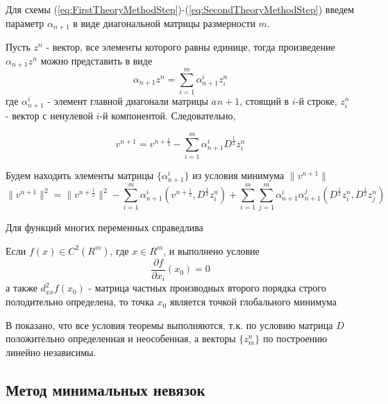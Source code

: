 Для схемы (\ref{eq:FirstTheoryMethodStep})-(\ref{eq:SecondTheoryMethodStep}) введем параметр $\alpha_{n+1}$ в виде диагональной матрицы размерности $m$.

Пусть $z^n$ - вектор, все элементы которого равны единице, тогда произведение $\alpha_{n+1}z^n$ можно представить в виде
\begin{equation}
    \label{eq:AlphaZSumm}
    \alpha_{n+1}z^n=\sum^m_{i=1}\alpha^i_{n+1}z^n_i
\end{equation}
где $\alpha^i_{n+1}$ - элемент главной диагонали матрицы $a_{}n+1$, стоящий в $i$-й строке, $z^n_i$ - вектор с ненулевой $i$-й компонентой. Следовательно,

\begin{equation}
    \label{eq:VAlphaDZSumm}
    v^{n+1}=v^{n+\frac{1}{2}}-\sum^m_{i=1}\alpha^i_{n+1}D^{\frac{1}{2}}z^n_i
\end{equation}

Будем находить элементы матрицы $\{\alpha^i_{n+1}\}$ из условия минимума $\|v^{n+1}\|$
\begin{equation}
    \label{eq:MinNormaV}
    \|v^{n+1}\|^2=\|v^{n+\frac{1}{2}}\|^2-\sum^m_{i=1}\alpha^i_{n+1}(v^{n+\frac{1}{2}},D^{\frac{1}{2}}z^n_i)+\sum^m_{i=1}\sum^m_{j=1}\alpha^i_{n+1}\alpha^j_{n+1}(D^{\frac{1}{2}}z^n_i,D^{\frac{1}{2}}z^n_j)
\end{equation}

Для функций многих переменных справедлива
\begin{Theorem}
    Если $f(x)\in C^2(R^m)$, где $x\in R^m$, и выполнено условие
    \begin{equation}
	\frac{\partial f}{\partial x_i}(x_0)=0
    \end{equation}
    а также $d^2_{xx}f(x_0)$ - матрица частных производных второго порядка строго полодительно определена, то точка $x_0$ является точкой глобального минимума
\end{Theorem}

В \cite{zakharov} показано, что все условия теоремы выполняются, т.к. по условию матрица $D$ положительно определенная и неособенная, а векторы $\{z^n_m\}$ по построению линейно независимы.

\addtocounter{subsection}{1}
\subsection*{Метод минимальных невязок}

